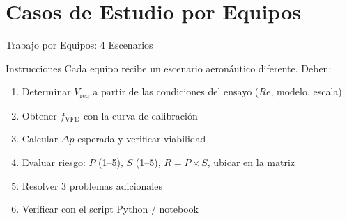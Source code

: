 \documentclass[aspectratio=169,12pt]{beamer}
\begin{document}
\section{Casos de Estudio por Equipos}

\begin{frame}{Trabajo por Equipos: 4 Escenarios}
	\begin{block}{Instrucciones}
		Cada equipo recibe un escenario aeronáutico diferente. Deben:
		\begin{enumerate}
			\item Determinar $V_\mathrm{req}$ a partir de las condiciones
			      del ensayo ($Re$, modelo, escala)
			\item Obtener $f_\mathrm{VFD}$ con la curva de calibración
			\item Calcular $\Delta p$ esperada y verificar viabilidad
			\item Evaluar riesgo: $P$ (1--5), $S$ (1--5),
			      $R = P \times S$, ubicar en la matriz
			\item Resolver 3 problemas adicionales
			\item Verificar con el script Python / notebook
		\end{enumerate}
	\end{block}
\end{frame}
\end{document}
